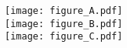 \documentclass[preview]{standalone}
\begin{document}
\begin{figure}
	\centering
	\texttt{[image: figure\_A.pdf]}\\
	\texttt{[image: figure\_B.pdf]}\\
	\texttt{[image: figure\_C.pdf]}
\end{figure}
\end{document}
